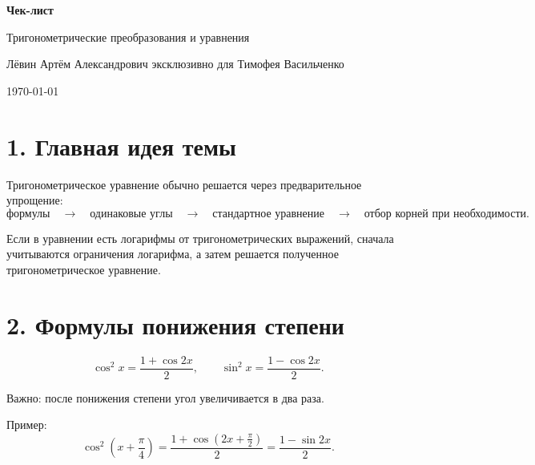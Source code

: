 \documentclass[a4paper,12pt]{article}
\begin{document}
\begin{titlepage}
\thispagestyle{empty}
\centering
\vspace*{0.18\textheight}

{\Huge\bfseries\textcolor{darkaccent}{Чек-лист}\par}
\vspace{0.8em}
{\LARGE Тригонометрические преобразования и уравнения\par}

\vspace{2.5em}
{\large Лёвин Артём Александрович эксклюзивно для Тимофея Васильченко\par}

\vspace{1.2em}
{\large \today\par}

\vfill

\end{titlepage}

\section*{1. Главная идея темы}

Тригонометрическое уравнение обычно решается через предварительное упрощение:
\[
\text{формулы} \quad \longrightarrow \quad
\text{одинаковые углы} \quad \longrightarrow \quad
\text{стандартное уравнение} \quad \longrightarrow \quad
\text{отбор корней при необходимости}.
\]

Если в уравнении есть логарифмы от тригонометрических выражений, сначала учитываются ограничения логарифма, а затем решается полученное тригонометрическое уравнение.

\section*{2. Формулы понижения степени}

\[
\cos^2 x=\frac{1+\cos2x}{2},
\qquad
\sin^2 x=\frac{1-\cos2x}{2}.
\]

Важно: после понижения степени угол увеличивается в два раза.

Пример:
\[
\cos^2\left(x+\frac{\pi}{4}\right)
=
\frac{1+\cos\left(2x+\frac{\pi}{2}\right)}{2}
=
\frac{1-\sin2x}{2}.
\]
\end{document}
